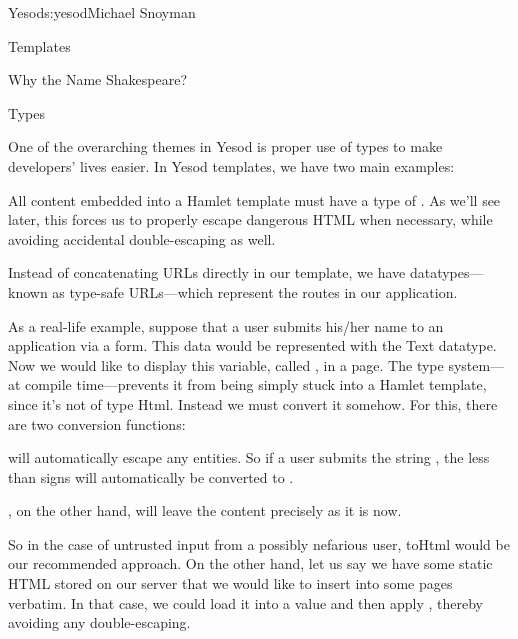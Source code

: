 \begin{aosachapter}{Yesod}{s:yesod}{Michael Snoyman}
\begin{aosasect1}{Templates}
\begin{aosabox}{Why the Name Shakespeare?}
\end{aosabox}

\begin{aosasect2}{Types}

One of the overarching themes in Yesod is proper use of types to make
developers' lives easier. In Yesod templates, we have two main
examples:

\begin{aosaenumerate}

\item All content embedded into a Hamlet template must have a type of
  . As we'll see later, this forces us to properly escape
  dangerous HTML when necessary, while avoiding accidental
  double-escaping as well.

\item Instead of concatenating URLs directly in our template, we have
  datatypes---known as type-safe URLs---which represent the routes in
  our application.

\end{aosaenumerate}

As a real-life example, suppose that a user submits his/her name to an
application via a form. This data would be represented with the Text
datatype. Now we would like to display this variable, called
, in a page. The type system---at compile time---prevents
it from being simply stuck into a Hamlet template, since it's not of
type Html. Instead we must convert it somehow. For this, there are two
conversion functions:

\begin{aosaenumerate}

\item {} will automatically escape any entities. So if a user
  submits the string , the less
  than signs will automatically be converted to \code{\&{\textless}}.

\item {}, on the other hand, will leave the content
  precisely as it is now.

\end{aosaenumerate}

So in the case of untrusted input from a possibly nefarious user,
toHtml would be our recommended approach. On the other hand, let us
say we have some static HTML stored on our server that we would like
to insert into some pages verbatim. In that case, we could load it
into a  value and then apply , thereby
avoiding any double-escaping.


\end{aosasect2}
\end{aosasect1}
\end{aosachapter}
